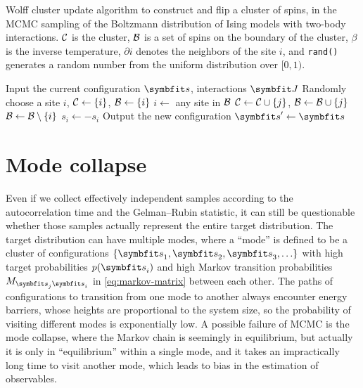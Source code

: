\begin{algorithm}[H]
\caption[Wolff cluster update]{
Wolff cluster update algorithm to construct and flip a cluster of spins, in the MCMC sampling of the Boltzmann distribution of Ising models with two-body interactions.
$\mathcal{C}$ is the cluster, $\mathcal{B}$ is a set of spins on the boundary of the cluster, $\beta$ is the inverse temperature, $\partial i$ denotes the neighbors of the site $i$, and \texttt{rand()} generates a random number from the uniform distribution over $[0, 1)$.
}
\label{alg:wolff}
\begin{algorithmic}[1]
\STATE Input the current configuration $\vs$, interactions $\mJ$
\STATE Randomly choose a site $i$, $\mathcal{C} \gets \{i\}$, $\mathcal{B} \gets \{i\}$
\WHILE{$\calB \neq \emptyset$}
    \STATE $i \gets$ any site in $\mathcal{B}$
            \STATE $\mathcal{C} \gets \mathcal{C} \cup \{j\}$, $\mathcal{B} \gets \mathcal{B} \cup \{j\}$
        \ENDIF
    \ENDFOR
    \STATE $\mathcal{B} \gets \mathcal{B} \setminus \{i\}$
\ENDWHILE
{}
    \STATE $s_i \gets -s_i$
\ENDFOR
\STATE Output the new configuration $\vs' \gets \vs$
\end{algorithmic}
\end{algorithm}


\section{Mode collapse}
\label{sec:mode-collapse}

Even if we collect effectively independent samples according to the autocorrelation time and the Gelman--Rubin statistic, it can still be questionable whether those samples actually represent the entire target distribution. The target distribution can have multiple modes, where a ``mode'' is defined to be a cluster of configurations $\{\vs_1, \vs_2, \vs_3, \ldots\}$ with high target probabilities $p(\vs_i)$ and high Markov transition probabilities $M_{\vs_j \vs_i}$ in \cref{eq:markov-matrix} between each other. The paths of configurations to transition from one mode to another always encounter energy barriers, whose heights are proportional to the system size, so the probability of visiting different modes is exponentially low. A possible failure of MCMC is the mode collapse, where the Markov chain is seemingly in equilibrium, but actually it is only in ``equilibrium'' within a single mode, and it takes an impractically long time to visit another mode, which leads to bias in the estimation of observables.

